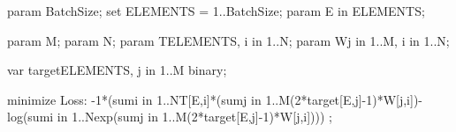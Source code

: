 param BatchSize;
set ELEMENTS = 1..BatchSize;
param E in ELEMENTS;

param M;
param N;
param T{ELEMENTS, i in 1..N};
param W{j in 1..M, i in 1..N};

var target{ELEMENTS, j in 1..M} binary;

minimize Loss:
	-1*(sum{i in 1..N}T[E,i]*(sum{j in 1..M}(2*target[E,j]-1)*W[j,i])-log(sum{i in 1..N}exp(sum{j in 1..M}(2*target[E,j]-1)*W[j,i]))) ;